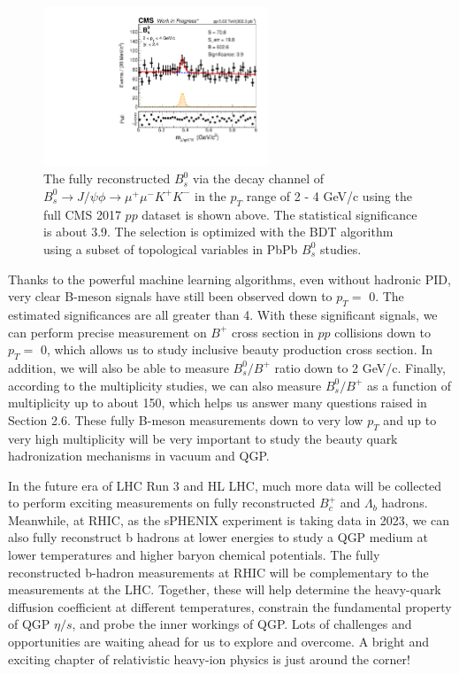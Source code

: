  \begin{figure}[hbtp]
\begin{center}
\includegraphics[width=0.60\textwidth]{Figures/Chapter6/BsLow.pdf}
\caption{The fully reconstructed $B^0_s$ via the decay channel of $B^0_s\rightarrow J/\psi \phi  \rightarrow \mu^+\mu^- K^+ K^-$ in the $p_T$ range of 2 - 4 GeV/c using the full CMS 2017 $pp$ dataset is shown above. The statistical significance is about 3.9. The selection is optimized with the BDT algorithm using a subset of topological variables in PbPb $B^0_s$ studies.}
\label{BsLow}
\end{center}
\end{figure}   

Thanks to the powerful machine learning algorithms, even without hadronic PID, very clear B-meson signals have still been observed down to $p_T =$ 0. The estimated significances are all greater than 4. With these significant signals, we can perform precise measurement on $B^+$ cross section in $pp$ collisions down to $p_T =$ 0, which allows us to study inclusive beauty production cross section. In addition, we will also be able to measure $B^0_s/B^+$ ratio down to 2 GeV/c. Finally, according to the multiplicity studies, we can also measure $B^0_s/B^+$ as a function of multiplicity up to about 150, which helps us answer many questions raised in Section 2.6. These fully B-meson measurements down to very low $p_T$ and up to very high multiplicity will be very important to study the beauty quark hadronization mechanisms in vacuum and QGP.

In the future era of LHC Run 3 and HL LHC, much more data will be collected to perform exciting measurements on fully reconstructed $B^+_c$ and $\Lambda_b$ hadrons. Meanwhile, at RHIC, as the sPHENIX experiment is taking data in 2023, we can also fully reconstruct b hadrons at lower energies to study a QGP medium at lower temperatures and higher baryon chemical potentials. The fully reconstructed b-hadron measurements at RHIC will be complementary to the measurements at the LHC. Together, these will help determine the heavy-quark diffusion coefficient at different temperatures, constrain the fundamental property of QGP $\eta/s$, and probe the inner workings of QGP. Lots of challenges and opportunities are waiting ahead for us to explore and overcome. A bright and exciting chapter of relativistic heavy-ion physics is just around the corner!




